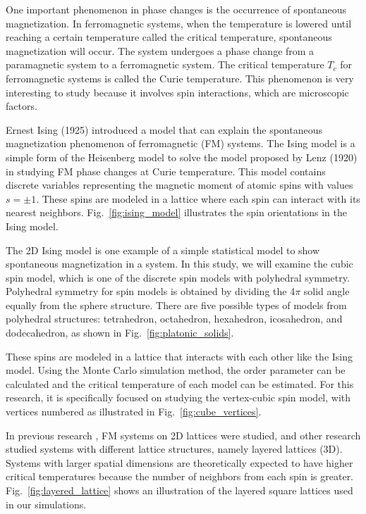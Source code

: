 One important phenomenon in phase changes is the occurrence of spontaneous magnetization. In ferromagnetic systems, when the temperature is lowered until reaching a certain temperature called the critical temperature, spontaneous magnetization will occur. The system undergoes a phase change from a paramagnetic system to a ferromagnetic system. The critical temperature $T_c$ for ferromagnetic systems is called the Curie temperature. This phenomenon is very interesting to study because it involves spin interactions, which are microscopic factors.

Ernest Ising (1925) introduced a model that can explain the spontaneous magnetization phenomenon of ferromagnetic (FM) systems. The Ising model is a simple form of the Heisenberg model to solve the model proposed by Lenz (1920) in studying FM phase changes at Curie temperature. This model contains discrete variables representing the magnetic moment of atomic spins with values $s = \pm 1$. These spins are modeled in a lattice where each spin can interact with its nearest neighbors. Fig.~\ref{fig:ising_model} illustrates the spin orientations in the Ising model.

The 2D Ising model is one example of a simple statistical model to show spontaneous magnetization in a system. In this study, we will examine the cubic spin model, which is one of the discrete spin models with polyhedral symmetry. Polyhedral symmetry for spin models is obtained by dividing the 4$\pi$ solid angle equally from the sphere structure. There are five possible types of models from polyhedral structures: tetrahedron, octahedron, hexahedron, icosahedron, and dodecahedron, as shown in Fig.~\ref{fig:platonic_solids}.

These spins are modeled in a lattice that interacts with each other like the Ising model. Using the Monte Carlo simulation method, the order parameter can be calculated and the critical temperature of each model can be estimated. For this research, it is specifically focused on studying the vertex-cubic spin model, with vertices numbered as illustrated in Fig.~\ref{fig:cube_vertices}.

In previous research \cite{Surungan2008}, FM systems on 2D lattices were studied, and other research \cite{Sutiono2013} studied systems with different lattice structures, namely layered lattices (3D). Systems with larger spatial dimensions are theoretically expected to have higher critical temperatures because the number of neighbors from each spin is greater. Fig.~\ref{fig:layered_lattice} shows an illustration of the layered square lattices used in our simulations.

